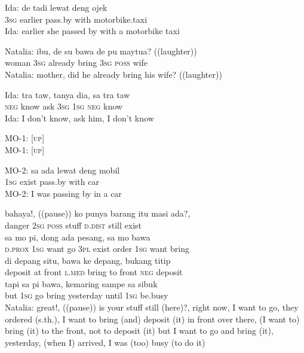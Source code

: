 \ea
\gll   Ida:   de   tadi   lewat   deng   ojek\\
 {}    \textsc{3sg}   earlier   pass.by   with   motorbike.taxi\\
\glt
Ida: earlier she passed by with a motorbike taxi
\z

\ea
\gll   Natalia:   ibu,   de   su   bawa   de   pu   maytua?   ((laughter))\\
 {}    woman   \textsc{3sg}   already   bring   \textsc{3sg}   \textsc{poss}   wife   \\
\glt
Natalia: mother, did he already bring his wife? ((laughter))
\z

\ea
\gll   Ida:   tra   taw,   tanya   dia,   sa   tra   taw\\
 {}    \textsc{neg}   know   ask   \textsc{3sg}   \textsc{1sg}   \textsc{neg}   know\\
\glt
Ida: I don’t know, ask him, I don’t know
\z

\ea
\gll   MO-1:   {\upshape\textsc{[up]}}\\
MO-1: [\textsc{up}]\\
\z

\ea
\gll   MO-2:   sa   ada   lewat   deng   mobil\\
 {}    \textsc{1sg}   exist   pass.by   with   car\\
\glt
MO-2: I was passing by in a car
\z

\ea
{}    {bahaya!,}    {((pause))}    {ko}    {punya}    {barang}    {itu}    {masi}   ada?,\\
   {}    {danger}    {}    {\textsc{2sg}}    {\textsc{poss}}    {stuff}    {\textsc{d.dist}}    {still}   exist\\
    {sa}    {mo}    {pi,}    {dong}    {ada}    {pesang,}    {sa}    {mo}    {bawa}\\
   {\textsc{d.prox}}    {\textsc{1sg}}    {want}    {go}    {\textsc{3pl}}    {exist}    {order}    {\textsc{1sg}}    {want}    {bring}\\
    {di}    {depang}    {situ,}    {bawa}    {ke}    {depang,}    {bukang}    {titip}\\
   {deposit}    {at}    {front}    {\textsc{l.med}}    {bring}    {to}    {front}    {\textsc{neg}}    {deposit}\\
\gll  tapi    {sa}    {pi}    {bawa,}    {kemaring}    {sampe}   sa    {sibuk}\\
  but    {\textsc{1sg}}    {go}    {bring}    {yesterday}    {until}   \textsc{1sg}    {be.busy}\\
\glt
Natalia: great!, ((pause)) is your stuff still (here)?, right now, I want to go, they ordered (s.th.), I want to bring (and) deposit (it) in front over there, (I want to) bring (it) to the front, not to deposit (it) but I want to go and bring (it), yesterday, (when I) arrived, I was (too) busy (to do it)
\z

